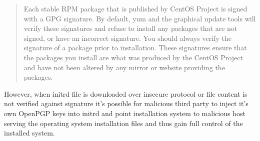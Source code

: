 \begin{quote}
Each stable RPM package that is published by CentOS Project is signed
with a GPG signature. By default, yum and the graphical update tools
will verify these signatures and refuse to install any packages that
are not signed, or have an incorrect signature. You should always
verify the signature of a package prior to installation. These
signatures ensure that the packages you install are what was produced
by the CentOS Project and have not been altered by any mirror or
website providing the packages.
\end{quote}

However, when initrd file is downloaded over insecure protocol or file
content is not verified against signature it's possible for malicious
third party to inject it's own OpenPGP keys into initrd and point
installation system to malicious host serving the operating system
installation files and thus gain full control of the installed system.
